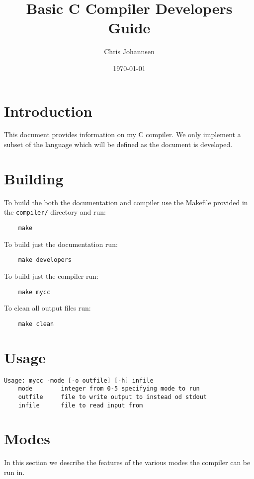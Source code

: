 \documentclass{article}
\title{Basic C Compiler Developers Guide}
\author{Chris Johannsen}
\date{\today}
\begin{document}
\maketitle

\section{Introduction}

This document provides information on my C compiler. We only implement a subset of the language which will be defined as the document is developed.

\section{Building}

To build the both the documentation and compiler use the Makefile provided in the \verb|compiler/| directory and run:

\begin{verbatim}
    make
\end{verbatim}

\noindent To build just the documentation run:

\begin{verbatim}
    make developers
\end{verbatim}

\noindent To build just the compiler run:

\begin{verbatim}
    make mycc
\end{verbatim}

\noindent To clean all output files run:

\begin{verbatim}
    make clean
\end{verbatim}

\section{Usage}

\begin{verbatim}
Usage: mycc -mode [-o outfile] [-h] infile
    mode        integer from 0-5 specifying mode to run
    outfile     file to write output to instead od stdout
    infile      file to read input from
\end{verbatim}

\section{Modes}

In this section we describe the features of the various modes the compiler can be run in.






\end{document}
